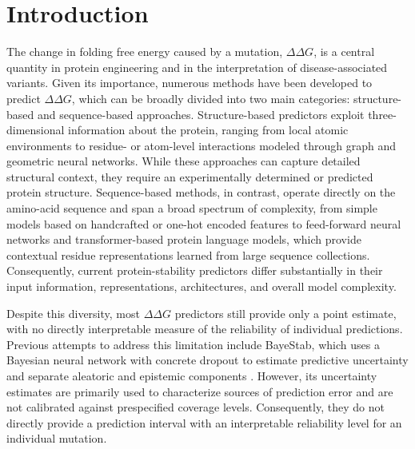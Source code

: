 \documentclass[11pt]{article}
\begin{document}
\section{Introduction}
The change in folding free energy caused by a mutation, \(\Delta\Delta G\), is a central quantity in protein engineering and in the interpretation of disease-associated variants\cite{mehra2019computational}\cite{meghwanshi2020enzymes}\cite{shi2025recent}. Given its importance, numerous methods have been developed to predict \(\Delta\Delta G\), which can be broadly divided into two main categories: structure-based and sequence-based approaches. Structure-based predictors exploit three-dimensional information about the protein, ranging from local atomic environments to residue- or atom-level interactions modeled through graph and geometric neural networks\cite{li2025generalizable}\cite{li2024prostage}\cite{rossi2025mass}. 
While these approaches can capture detailed structural context, they require an experimentally determined or predicted protein structure. Sequence-based methods, in contrast, operate directly on the amino-acid sequence and span a broad spectrum of complexity, from simple models based on handcrafted or one-hot encoded features to feed-forward neural networks and transformer-based protein language models, which provide contextual residue representations learned from large sequence collections\cite{barducci2026janusddg}\cite{savojardo2025ddgemb}. Consequently, current protein-stability predictors differ substantially in their input information, representations, architectures, and overall model complexity.

Despite this diversity, most $\Delta\Delta G$ predictors still provide only a
point estimate, with no directly interpretable measure of the reliability of
individual predictions\cite{sanavia2020limitations}\cite{qiu2024review}. Previous attempts to address this limitation include
BayeStab, which uses a Bayesian neural network with concrete dropout to estimate
predictive uncertainty and separate aleatoric and epistemic components
\cite{wang2022bayestab}. However, its uncertainty estimates are primarily used
to characterize sources of prediction error and are not calibrated against
prespecified coverage levels. Consequently, they do not directly provide a
prediction interval with an interpretable reliability level for an individual
mutation. 
\end{document}
